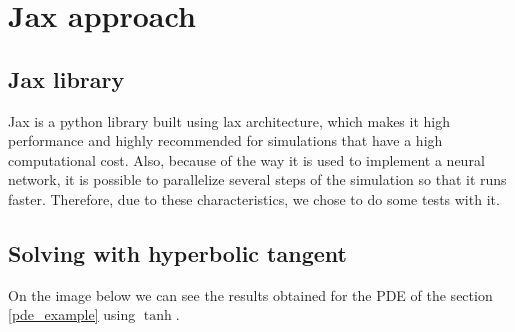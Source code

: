 \section{Jax approach}
\subsection{Jax library}
Jax is a python library built using lax architecture, which makes it high performance and highly recommended for simulations that have a high computational cost. Also, because of the way it is used to implement a neural network, it is possible to parallelize several steps of the simulation so that it runs faster.  
Therefore, due to these characteristics, we chose to do some tests with it.

\subsection{Solving with hyperbolic tangent}
On the image below we can see the results obtained for the PDE of the section \ref{pde_example} using $\tanh$.
